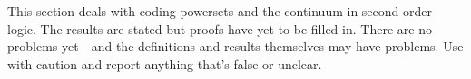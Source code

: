 \documentclass[../../../include/open-logic-chapter]{subfiles}
\begin{document}

\begin{editorial}
This section deals with coding powersets and the continuum in
second-order logic. The results are stated but proofs have yet to be
filled in. There are no problems yet---and the definitions and results
themselves may have problems. Use with caution and report anything
that's false or unclear.
\end{editorial}





\OLEndChapterHook
\end{document}
